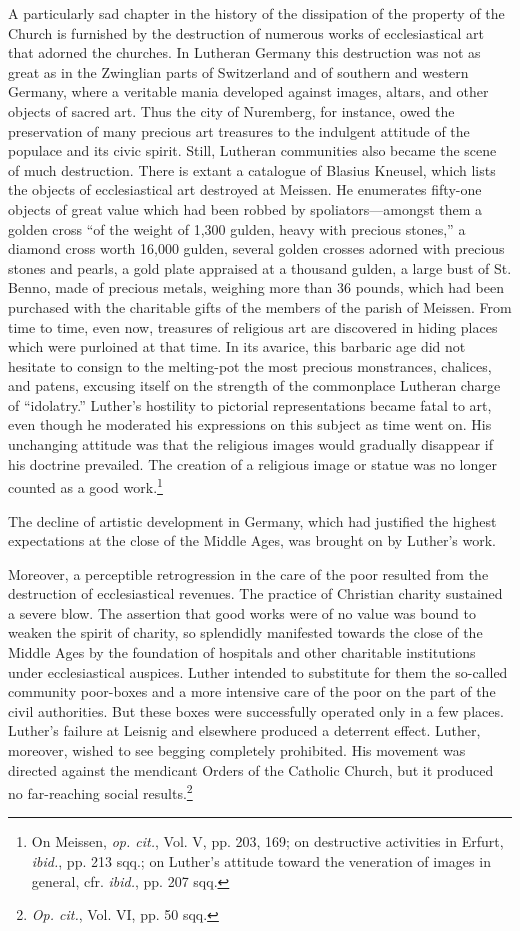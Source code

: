 A particularly sad chapter in the history of the dissipation of the
property of the Church is furnished by the destruction of numerous
works of ecclesiastical art that adorned the churches. In Lutheran
Germany this destruction was not as great as in the Zwinglian parts
of Switzerland and of southern and western Germany, where a veritable
mania developed against images, altars, and other objects of
sacred art. Thus the city of Nuremberg, for instance, owed the preservation
of many precious art treasures to the indulgent attitude of the
populace and its civic spirit. Still, Lutheran communities also became
the scene of much destruction. There is extant a catalogue of Blasius
Kneusel, which lists the objects of ecclesiastical art destroyed at Meissen.
He enumerates fifty-one objects of great value which had been
robbed by spoliators—amongst them a golden cross “of the weight
of 1,300 gulden, heavy with precious stones,” a diamond cross worth
16,000 gulden, several golden crosses adorned with precious stones
and pearls, a gold plate appraised at a thousand gulden, a large bust
of St. Benno, made of precious metals, weighing more than 36
pounds, which had been purchased with the charitable gifts of the
members of the parish of Meissen. From time to time, even now,
treasures of religious art are discovered in hiding places which were
purloined at that time. In its avarice, this barbaric age did not hesitate
to consign to the melting-pot the most precious monstrances, chalices,
and patens, excusing itself on the strength of the commonplace
Lutheran charge of “idolatry.” Luther’s hostility to pictorial representations
became fatal to art, even though he moderated his expressions on this
subject as time went on. His unchanging attitude was
that the religious images would gradually disappear if his doctrine
prevailed. The creation of a religious image or statue was no longer
counted as a good work.\footnote
{On Meissen, \textit{op. cit.}, Vol. V, pp. 203, 169; on destructive activities in Erfurt, \textit{ibid.},
pp. 213 sqq.; on Luther’s attitude toward the veneration of images in general, cfr. \textit{ibid.},
pp. 207 sqq.}

The decline of artistic development in
Germany, which had justified the highest expectations at the close of
the Middle Ages, was brought on by Luther’s work.

Moreover, a perceptible retrogression in the care of the poor resulted
from the destruction of ecclesiastical revenues. The practice
of Christian charity sustained a severe blow. The assertion that
good works were of no value was bound to weaken the spirit of charity,
so splendidly manifested towards the close of the Middle Ages
by the foundation of hospitals and other charitable institutions under
ecclesiastical auspices. Luther intended to substitute for them the
so-called community poor-boxes and a more intensive care of the
poor on the part of the civil authorities. But these boxes were successfully
operated only in a few places. Luther’s failure at Leisnig and
elsewhere produced a deterrent effect. Luther, moreover, wished to see
begging completely prohibited. His movement was directed against
the mendicant Orders of the Catholic Church, but it produced no
far-reaching social results.\footnote{\textit{Op. cit.}, Vol. VI, pp. 50 sqq.}


